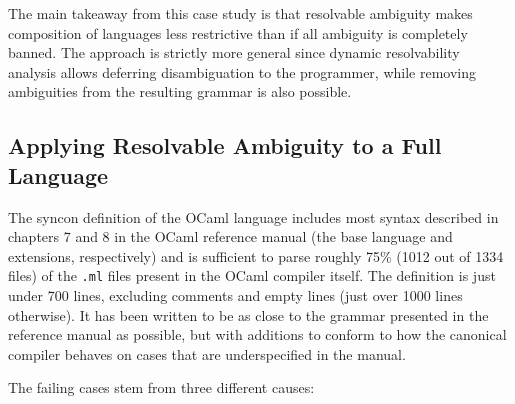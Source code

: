\documentclass[acmsmall,review,anonymous]{acmart}\settopmatter{printfolios=true,printccs=false,printacmref=false}
\begin{document}
The main takeaway from this case study is that resolvable
ambiguity makes composition of languages less restrictive than if
all ambiguity is completely banned. The approach is strictly more
general since dynamic resolvability analysis allows deferring
disambiguation to the programmer, while removing ambiguities from
the resulting grammar is also possible.


\subsection{Applying Resolvable Ambiguity to a Full Language} \label{sec:evaluation-ocaml}

The syncon definition of the OCaml language includes most syntax described in chapters 7 and 8 in the OCaml reference manual (the base language and extensions, respectively) and is sufficient to parse roughly 75\% (1012 out of 1334 files) of the \verb|.ml| files present in the OCaml compiler itself. The definition is just under 700 lines, excluding comments and empty lines (just over 1000 lines otherwise). It has been written to be as close to the grammar presented in the reference manual as possible, but with additions to conform to how the canonical compiler behaves on cases that are underspecified in the manual.

The failing cases stem from three different causes:
\end{document}
